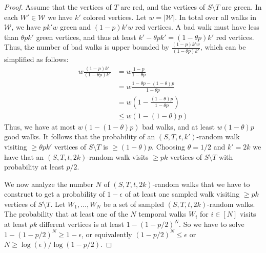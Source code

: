 {{\begin{proof}
    Assume that {the %
    vertices} of $T$ are red, and the vertices of $S\setminus T$ are
    green. In each $W' \in \mathcal{W}$ we have $k'$ colored vertices. 
    Let $w=|\mathcal{W}|$. In total over all {walks} in $\mathcal{W}$, we have $pk'w$ green and $(1-p)k'w$
    red vertices. A bad walk must have less than $\theta pk'$ green vertices,
    and thus at least $k'-\theta pk'=(1-\theta p)k'$ 
    red vertices. Thus, the
    number of bad walks is upper bounded by {$\frac{(1-p)k' w}{(1-\theta p)k'}$},
    which can be simplified as follows:
    \begin{align*}
        w\frac{(1-p)k'}{(1-\theta p)k'}  &= w\frac{1-p}{1-\theta p} \\
                                        &= w\frac{1-\theta p - (1-\theta)p}{1-\theta p} \\
                                        &= w(1-\frac{(1-\theta)p}{1-\theta p}) \\
                                        &\leq w(1-(1-\theta)p)
    \end{align*}
    Thus, we have at most $w(1-(1-\theta)p)$ bad walks, and at least
    $w(1-\theta)p$ good walks. It follows that the probability of an $(S, T,
    t, k')$-random walk visiting $\geq \theta pk'$ vertices of $S\setminus T$
    is $\geq (1-\theta) p$. Choosing $\theta = 1/2$ and $k'=2k$ we have that an
    $(S, T, t, 2k)$-random walk visits $\geq pk$ vertices of $S \setminus T$
    with probability at least $p/2$.

    We now analyze the number $N$ of $(S, T, t, 2k)$-random walks that we have to construct to get a
    probability of $1-\epsilon$ of {at least one sampled walk visiting $\geq pk$} vertices of $S\setminus
    T$. Let $W_1, \ldots, W_N$ be a set of sampled {$(S, T, t, 2k)$}-random walks.
    The probability that at least one of the $N$ temporal walks $W_i$ for $i \in
    [N]$ visits at least $pk$ different vertices is at least $1 - (1-p/2)^N$.
    So we have to solve $1 - (1-p/2)^N \geq 1 - \epsilon$, {
    or equivalently
    $(1-p/2)^N \leq \epsilon$ or $N\geq \log(\epsilon)/\log(1-p/2)$.}
%


\end{proof}}}

